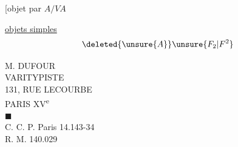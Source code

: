 [objet   par $A/VA$

\uline{ objets  simples}
\[
\deleted{\unsure{A}}\unsure{F_2|F^2}
\]
\begin{flushright}
M. DUFOUR\\
VARITYPISTE\\
131, RUE LECOURBE\\
PARIS XV\textsuperscript{e}\\
$\blacksquare$\\
C. C. P. Paris 14.143-34\\
R. M. 140.029
\end{flushright}
